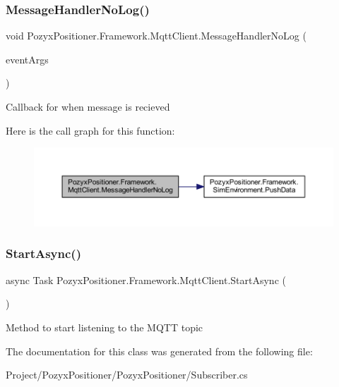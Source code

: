\subsubsection{\texorpdfstring{Message\+Handler\+No\+Log()}{MessageHandlerNoLog()}}
{\footnotesize\ttfamily void Pozyx\+Positioner.\+Framework.\+Mqtt\+Client.\+Message\+Handler\+No\+Log (\begin{DoxyParamCaption}\item[{Mqtt\+Application\+Message\+Received\+Event\+Args}]{event\+Args }\end{DoxyParamCaption})\hspace{0.3cm}{\ttfamily [private]}}



Callback for when message is recieved 

Here is the call graph for this function\+:
\nopagebreak
\begin{figure}[H]
\begin{center}
\leavevmode
\includegraphics[width=350pt]{class_pozyx_positioner_1_1_framework_1_1_mqtt_client_ab9a1361b72712044aa1d770006ebd6cd_cgraph}
\end{center}
\end{figure}
\mbox{\label{class_pozyx_positioner_1_1_framework_1_1_mqtt_client_a92ccb3ea4e84923cfb26c02367fac49e}} 
\subsubsection{\texorpdfstring{Start\+Async()}{StartAsync()}}
{\footnotesize\ttfamily async Task Pozyx\+Positioner.\+Framework.\+Mqtt\+Client.\+Start\+Async (\begin{DoxyParamCaption}{ }\end{DoxyParamCaption})\hspace{0.3cm}{\ttfamily [private]}}



Method to start listening to the M\+Q\+TT topic 



The documentation for this class was generated from the following file\+:\begin{DoxyCompactItemize}
\item 
Project/\+Pozyx\+Positioner/\+Pozyx\+Positioner/Subscriber.\+cs\end{DoxyCompactItemize}
